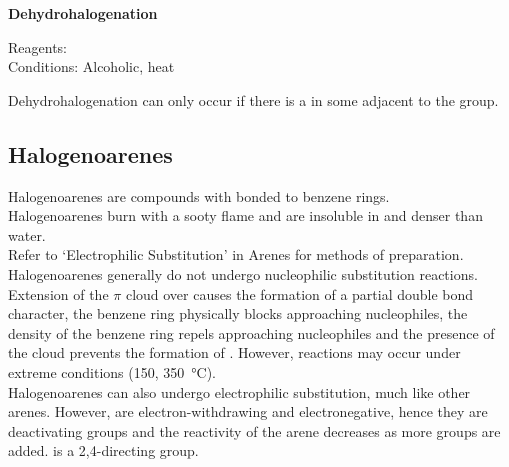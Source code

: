 \documentclass[../main]{subfiles}
\begin{document}
	\noindent \textbf{Dehydrohalogenation}

	Reagents:  \\
	Conditions: Alcoholic, heat \\


	Dehydrohalogenation can only occur if there is a  in some  adjacent to the  group. \\

	\subsection{Halogenoarenes}

	Halogenoarenes are compounds with  bonded to benzene rings. \\

	Halogenoarenes burn with a sooty flame and are insoluble in and denser than water. \\

	Refer to `Electrophilic Substitution' in Arenes for methods of preparation. \\

	Halogenoarenes generally do not undergo nucleophilic substitution reactions. Extension of the \(\pi\)  cloud over  causes the formation of a partial double bond character, the benzene ring physically blocks approaching nucleophiles, the  density of the benzene ring repels approaching nucleophiles and the presence of the  cloud prevents the formation of . However, reactions may occur under extreme conditions (\SI{150}{\atm}, \SI{350}{\celsius}).\\

	Halogenoarenes can also undergo electrophilic substitution, much like other arenes. However,  are electron-withdrawing and electronegative, hence they are deactivating groups and the reactivity of the arene decreases as more  groups are added.  is a 2,4-directing group.
\end{document}
